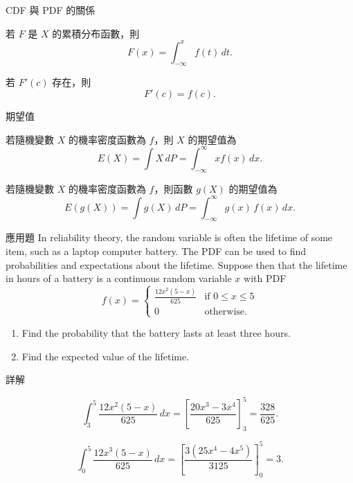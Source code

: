 \documentclass{beamer}
\theoremstyle{remark}
\begin{document}
\begin{CJK}{UTF8}{bsmi}
\begin{frame}{CDF 與 PDF 的關係}
  \begin{theorem}
    若 $F$ 是 $X$ 的累積分布函數，則
    \[F(x) = \int_{-\infty}^x f(t)\,dt.\]
  \end{theorem}
  \begin{theorem}
    若 $F'(c)$ 存在，則
    \[F'(c) = f(c).\]
  \end{theorem}
\end{frame}

\begin{frame}{期望值}
  \begin{definition}
    若隨機變數 $X$ 的機率密度函數為 $f$，則 $X$ 的期望值為
    \[E(X) = \int X\,dP = \int_{-\infty}^\infty xf(x)\,dx.\]
  \end{definition}
  \begin{theorem}
    若隨機變數 $X$ 的機率密度函數為 $f$，則函數 $g(X)$ 的期望值為
    \[E(g(X)) = \int g(X)\,dP = \int_{-\infty}^\infty g(x)\,f(x)\,dx.\]
  \end{theorem}
\end{frame}

\begin{frame}{應用題}
  In reliability theory, the random variable is often the lifetime of some item, such as a laptop computer battery.  The
  PDF can be used to find probabilities and expectations about the lifetime.  Suppose then that the lifetime in hours of a
  battery is a continuous random variable $x$ with PDF
  \[f(x) = \begin{cases}
    \frac{12x^2 \left( 5-x \right)}{625} & \mbox{if } 0 \le x \le 5\\
    0 & \mbox{otherwise.}\end{cases}\]
  \begin{enumerate}
    \item Find the probability that the battery lasts at least three hours.
    \item Find the expected value of the lifetime.
  \end{enumerate}
\end{frame}

\begin{frame}{詳解}
  \begin{solution}
    \[\int_3^5 \frac{12x^2 \left( 5-x \right)}{625}\,dx = \left[ \frac{20x^3 - 3x^4}{625} \right]_3^5 = \frac{328}{625}.\]
  \end{solution}
  \begin{solution}
    \[\int_0^5 \frac{12x^3 \left( 5-x \right)}{625}\,dx = \left[ \frac{3 \left( 25x^4 - 4x^5 \right)}{3125} \right]_0^5 = 3.\]
  \end{solution}
\end{frame}


\end{CJK}
\end{document}
